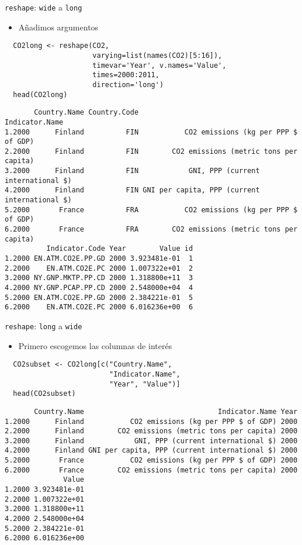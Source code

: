 \documentclass[xcolor={usenames,svgnames,dvipsnames}]{beamer}
\begin{document}
\begin{frame}[fragile,label=sec-4-4]{\texttt{reshape}: \texttt{wide} a \texttt{long}}
 \begin{itemize}
\item Añadimos argumentos
\end{itemize}
\lstset{language=R,label= ,caption= ,numbers=none}
\begin{lstlisting}
  CO2long <- reshape(CO2,
                     varying=list(names(CO2)[5:16]),
                     timevar='Year', v.names='Value',
                     times=2000:2011,
                     direction='long')
  head(CO2long)
\end{lstlisting}

\begin{verbatim}
       Country.Name Country.Code                                Indicator.Name
1.2000      Finland          FIN           CO2 emissions (kg per PPP $ of GDP)
2.2000      Finland          FIN        CO2 emissions (metric tons per capita)
3.2000      Finland          FIN            GNI, PPP (current international $)
4.2000      Finland          FIN GNI per capita, PPP (current international $)
5.2000       France          FRA           CO2 emissions (kg per PPP $ of GDP)
6.2000       France          FRA        CO2 emissions (metric tons per capita)
          Indicator.Code Year        Value id
1.2000 EN.ATM.CO2E.PP.GD 2000 3.923481e-01  1
2.2000    EN.ATM.CO2E.PC 2000 1.007322e+01  2
3.2000 NY.GNP.MKTP.PP.CD 2000 1.318800e+11  3
4.2000 NY.GNP.PCAP.PP.CD 2000 2.548000e+04  4
5.2000 EN.ATM.CO2E.PP.GD 2000 2.384221e-01  5
6.2000    EN.ATM.CO2E.PC 2000 6.016236e+00  6
\end{verbatim}
\end{frame}

\begin{frame}[fragile,label=sec-4-5]{\texttt{reshape}: \texttt{long} a \texttt{wide}}
 \begin{itemize}
\item Primero escogemos las columnas de interés
\end{itemize}
\lstset{language=R,label= ,caption= ,numbers=none}
\begin{lstlisting}
  CO2subset <- CO2long[c("Country.Name",
                         "Indicator.Name",
                         "Year", "Value")]
  head(CO2subset)
\end{lstlisting}

\begin{verbatim}
       Country.Name                                Indicator.Name Year
1.2000      Finland           CO2 emissions (kg per PPP $ of GDP) 2000
2.2000      Finland        CO2 emissions (metric tons per capita) 2000
3.2000      Finland            GNI, PPP (current international $) 2000
4.2000      Finland GNI per capita, PPP (current international $) 2000
5.2000       France           CO2 emissions (kg per PPP $ of GDP) 2000
6.2000       France        CO2 emissions (metric tons per capita) 2000
              Value
1.2000 3.923481e-01
2.2000 1.007322e+01
3.2000 1.318800e+11
4.2000 2.548000e+04
5.2000 2.384221e-01
6.2000 6.016236e+00
\end{verbatim}
\end{frame}
\end{document}
